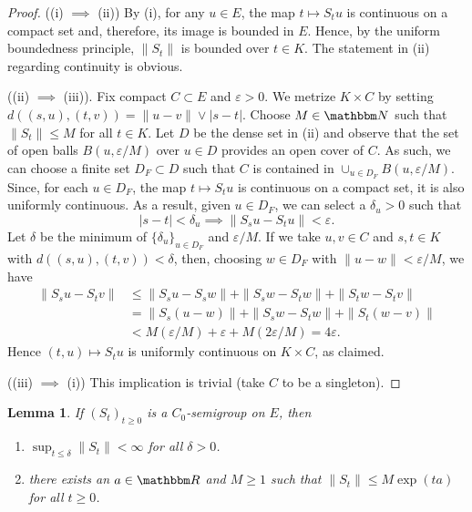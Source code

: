 \documentclass[12pt, reqno]{amsart}
\renewcommand{\leq}{\leqslant}
\renewcommand{\geq}{\geqslant}
\newcommand{\1}{\mathbbm 1}
\newcommand{\RR}{\mathbbm R}
\newcommand{\NN}{\mathbbm N}
\renewcommand{\epsilon}{\varepsilon}
\theoremstyle{plain}
\newtheorem{lemma}[theorem]{Lemma}
\theoremstyle{definition}
\begin{document}
\begin{proof}
    ((i) $\implies$ (ii)) By (i), for any $u \in E$, the map $t \mapsto S_t u$ is
    continuous on a compact set and, therefore, its image is bounded in $E$.  
    Hence, by the uniform boundedness principle, $\|S_t\|$ is bounded over $t
    \in K$.  The statement in (ii) regarding continuity is obvious.

    ((ii) $\implies$ (iii)).  Fix compact $C \subset E$ and $\epsilon > 0$.
    We metrize $K \times C$ by setting $d((s, u), (t, v)) = \| u - v\| \vee |s-t|$.
    Choose $M \in \NN$ such that $\|S_t\| \leq M$ for all $t \in K$.  Let $D$ be the
    dense set in (ii) and observe that the set of open balls $B(u, \epsilon/M)$
    over $u \in D$ provides an open cover of $C$.  As such, we can choose a finite
    set $D_F \subset D$ such that $C$ is contained in $\cup_{u \in D_F} B(u,
    \epsilon/M)$. Since, for each $u \in D_F$, the map
    $t \mapsto S_t u$ is continuous on a compact set, it is also uniformly
    continuous.  As a result, given $u \in D_F$, we can select a $\delta_u > 0$ such that
    \begin{equation*}
        |s - t| < \delta_u \implies \| S_s u - S_t u \| < \epsilon.
    \end{equation*}
    Let $\delta$ be the minimum of $\{\delta_u\}_{u \in D_F}$ and $\epsilon / M$.
    If we take $u, v \in C$ and $s, t \in K$ with $d((s, u), (t, v)) < \delta$, then,
    choosing $w \in D_F$ with $\|u - w \| < \epsilon / M$, we have
    \begin{align*}
        \| S_s u - S_t v \|
        & \leq \| S_s u - S_s w \| 
            + \| S_s w - S_t w \| 
                + \| S_t w - S_t v \|
                \\
        & = \| S_s (u - w) \| 
            + \| S_s w - S_t w \| 
                + \| S_t (w - v) \|
                \\
        & < M (\epsilon / M) + \epsilon + M (2 \epsilon / M) = 4 \epsilon.
    \end{align*}
    Hence $(t, u) \mapsto S_t u$ is
            uniformly continuous on $K \times C$, as claimed.

    ((iii) $\implies$ (i)) This implication is trivial (take $C$ to be a
    singleton).
\end{proof}

\begin{lemma}\label{l:ubfc}
    If $(S_t)_{t \geq 0}$ is a $C_0$-semigroup on $E$, then
    \begin{enumerate}
        \item $\sup_{t \leq \delta} \| S_t \| < \infty$ for all $\delta > 0$.
        \item there exists an $a \in \RR$ and $M \geq 1$ such that $\|S_t \|
            \leq M \exp(t a)$ for all $t \geq 0$.
    \end{enumerate}
\end{lemma}
\end{document}
